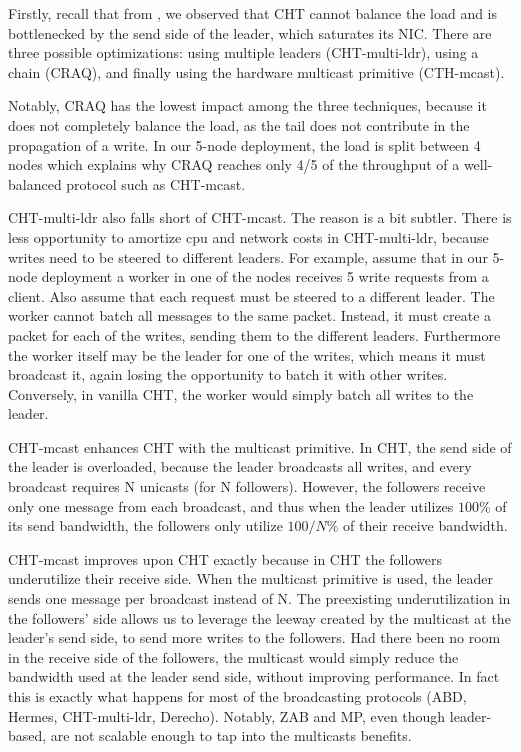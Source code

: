 Firstly, recall that from , we observed that CHT cannot balance the load and is bottlenecked by the send side of the leader, which saturates its NIC. There are three possible optimizations: using multiple leaders (CHT-multi-ldr), using a chain (CRAQ), and finally using the hardware multicast primitive (CTH-mcast). 

Notably, CRAQ has the lowest impact among the three techniques,
because it does not completely balance the load, as the tail does not contribute in the propagation of a write. In our 5-node deployment, the load is split between 4 nodes which explains why CRAQ reaches only 4/5 of the throughput of a well-balanced protocol such as CHT-mcast.

CHT-multi-ldr also falls short of CHT-mcast. The reason is a bit subtler. There is less opportunity to amortize cpu and network costs in CHT-multi-ldr, because writes need to be steered to different leaders. 
For example, assume that in our 5-node deployment a worker in one of the nodes receives 5 write requests from a client. Also assume that each request must be steered to a different leader. The worker cannot batch all messages to the same packet. Instead, it must create a packet for each of the writes, sending them to the different leaders. Furthermore the worker itself may be the leader for one of the writes, which means it must broadcast it, again losing the opportunity to batch it with other writes. 
Conversely, in vanilla CHT, the worker would simply batch all writes to the leader.

CHT-mcast enhances CHT with the multicast primitive.
In CHT, the send side of the leader is overloaded, because the leader broadcasts all writes, and every broadcast requires N unicasts (for N followers). However, the followers receive only one message from each broadcast, and thus when the leader utilizes $100$\% of its send bandwidth, the followers only utilize  $100/N$\% of their receive bandwidth.

CHT-mcast improves upon CHT exactly because in CHT the followers underutilize their receive side.
When the multicast primitive is used, the leader sends one message per broadcast instead of N. The preexisting underutilization in the followers' side allows us to leverage the leeway created by the multicast at the leader's send side, to send more writes to the followers.
Had there been no room in the receive side of the followers, the multicast would simply reduce the bandwidth used at the leader send side, without improving performance.
In fact this is exactly what happens for most of the broadcasting protocols (ABD, Hermes, CHT-multi-ldr, Derecho).
Notably, ZAB and MP, even though leader-based, are not scalable enough to tap into the multicasts benefits. %




